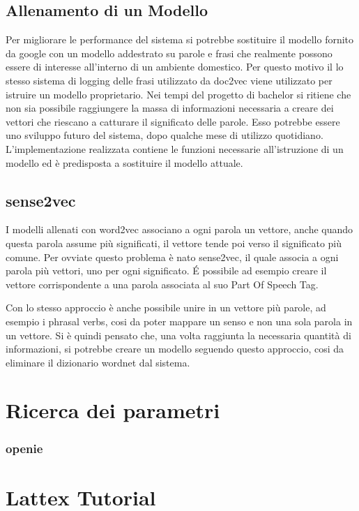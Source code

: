 \documentclass[twoside]{supsistudent}
\begin{document}
\section{Allenamento di un Modello}
Per migliorare le performance del sistema si potrebbe sostituire il modello fornito da google con un modello addestrato su parole e frasi che realmente possono essere di interesse all'interno di un ambiente domestico. Per questo motivo il lo stesso sistema di logging delle frasi utilizzato da doc2vec viene utilizzato per istruire un modello proprietario. Nei tempi del progetto di bachelor si ritiene che non sia possibile raggiungere la massa di informazioni necessaria a creare dei vettori che riescano a catturare il significato delle parole. Esso potrebbe essere uno sviluppo futuro del sistema, dopo qualche mese di utilizzo quotidiano. L'implementazione realizzata contiene le funzioni necessarie all'istruzione di un modello ed è predisposta a sostituire il modello attuale.
\section{sense2vec}
I modelli allenati con word2vec associano a ogni parola un vettore, anche quando questa parola assume più significati, il vettore tende poi verso il significato più comune. Per ovviate questo problema è nato sense2vec, il quale associa a ogni parola più vettori, uno per ogni significato. É possibile ad esempio creare il vettore corrispondente a una parola associata al suo Part Of Speech Tag.  \cite{posCategories} \cite{sense2vec} 

Con lo stesso approccio è anche possibile unire in un vettore più parole, ad esempio i phrasal verbs, cosi da poter mappare un senso e non una sola parola in un vettore. Si è quindi pensato che, una volta raggiunta la necessaria quantità di informazioni, si potrebbe creare un modello seguendo questo approccio, cosi da eliminare il dizionario wordnet dal sistema.


\chapter{Ricerca dei parametri}
\subsection{openie}

\chapter{Lattex Tutorial}
\lipsum[13]
\end{document}
